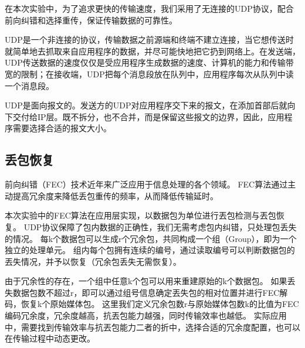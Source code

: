 \documentclass[onecolumn]{article}
\begin{document}
\begin{CJK*}{UTF8}{gbsn}
		在本次实验中，为了追求更快的传输速度，我们采用了无连接的UDP协议，配合前向纠错和选择重传，保证传输数据的可靠性。
		
		UDP是一个非连接的协议，传输数据之前源端和终端不建立连接，当它想传送时就简单地去抓取来自应用程序的数据，并尽可能快地把它扔到网络上。在发送端，UDP传送数据的速度仅仅是受应用程序生成数据的速度、计算机的能力和传输带宽的限制；在接收端，UDP把每个消息段放在队列中，应用程序每次从队列中读一个消息段。
		
		UDP是面向报文的。发送方的UDP对应用程序交下来的报文，在添加首部后就向下交付给IP层。既不拆分，也不合并，而是保留这些报文的边界，因此，应用程序需要选择合适的报文大小。
		
		\subsection{丢包恢复}
		
		前向纠错（FEC）技术近年来广泛应用于信息处理的各个领域。
		FEC算法通过主动提高冗余度来降低丢包重传的频率，从而降低传输延时。
		
		本次实验中的FEC算法在应用层实现，以数据包为单位进行丟包检测与丟包恢复。
		UDP协议保障了包内数据的正确性，我们无需考虑包内纠错，只处理包丢失的情况。
		每k个数据包可以生成r个冗余包，共同构成一个组（Group），即为一个独立的处理单元。
		组内每个包拥有连续的编号，通过读取编号可以判断数据包的丟失情况，并予以恢复（冗余包丢失无需恢复）。 
		
		由于冗余性的存在，一个组中任意k个包可以用来重建原始的k个数据包。
		如果丢失数据包数不超过r，即可以通过组号信息确定丟失包的相对位置并进行FEC解码，恢复k个原始媒体包。
		这里我们定义冗余包数r与原始媒体包数k的比值为FEC编码冗余度，冗余度越高，抗丟包能力越强，同时传输效率也越低。
		实际应用中，需要找到传输效率与抗丟包能力二者的折中，选择合适的冗余度配置，也可以在传输过程中动态更改。
		

\end{CJK*}
\end{document}
